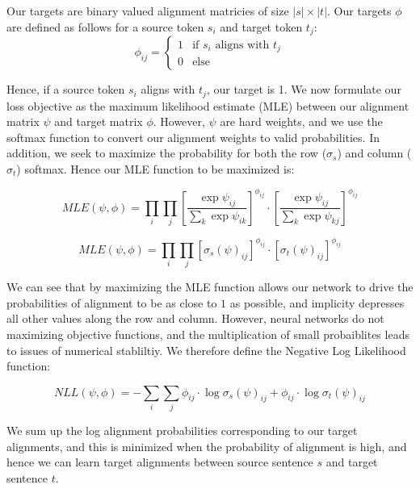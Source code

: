 \documentclass[twoside,twocolumn]{article}
\begin{document}
Our targets are binary valued alignment matricies of size $|s| \times |t|$. Our targets $\phi$ are defined as follows for a source token $s_i$ and target token $t_j$:
\begin{equation}
  \phi_{ij} = \begin{cases}
  1 & \text{if } s_i \text{ aligns with } t_j \\
  0 & \text{else}
  \end{cases}
\end{equation}

Hence, if a source token $s_i$ aligns with $t_j$, our target is 1. We now formulate our loss objective as the maximum likelihood estimate (MLE) between our alignment matrix $\psi$ and target matrix $\phi$. However, $\psi$ are hard weights, and we use the softmax function to convert our alignment weights to valid probabilities. In addition, we seek to maximize the probability for both the row ($\sigma_s$) and column ($\sigma_t$) softmax. Hence our MLE function to be maximized is:

\begin{equation}
  MLE(\psi, \phi) = \prod_i \prod_j \left[ \frac{\exp \psi_{ij}}{\sum_k \exp \psi_{ik}} \right]^{\phi_{ij}} \cdot \left[ \frac{\exp \psi_{ij}}{\sum_k \exp \psi_{kj}} \right]^{\phi_{ij}}
\end{equation}


\begin{equation}
  MLE(\psi, \phi) = \prod_i \prod_j \left[ \sigma_s(\psi)_{ij} \right]^{\phi_{ij}} \cdot \left[ \sigma_t(\psi)_{ij} \right]^{\phi_{ij}}
\end{equation}

We can see that by maximizing the MLE function allows our network to drive the probabilities of alignment to be as close to $1$ as possible, and implicity depresses all other values along the row and column. However, neural networks do not maximizing objective functions, and the multiplication of small probaiblites leads to issues of numerical stabliltiy. We therefore define the Negative Log Likelihood function:

\begin{equation}
  NLL(\psi, \phi) = - \sum_i \sum_j  \phi_{ij} \cdot \log \sigma_s (\psi)_{ij} + \phi_{ij} \cdot \log \sigma_t (\psi)_{ij}
\end{equation}

We sum up the log alignment probabilities corresponding to our target alignments, and this is minimized when the probability of alignment is high, and hence we can learn target alignments between source sentence $s$ and target sentence $t$.
\end{document}

